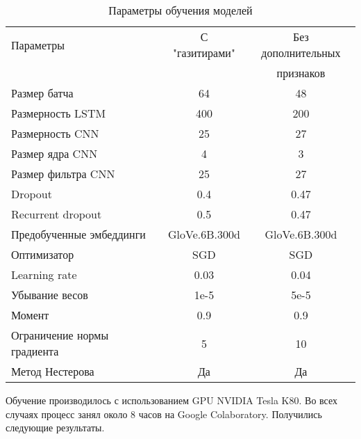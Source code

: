 \documentclass[a4paper,14pt]{extarticle}
\begin{document}
\begin{table}[H]
    \caption{Параметры обучения моделей}
    \label{progress}
    \begin{center}
    \begin{tabular}{l|c|c}
        Параметры                   & С "газитирами" & Без дополнительных \\
                                    &                & признаков          \\
        \hline
        Размер батча                & 64             & 48                 \\
        Размерность LSTM            & 400            & 200                \\
        Размерность CNN             & 25             & 27                 \\
        Размер ядра CNN             & 4              & 3                  \\
        Размер фильтра CNN          & 25             & 27                 \\
        Dropout                     & 0.4            & 0.47               \\
        Recurrent dropout           & 0.5            & 0.47               \\
        Предобученные эмбеддинги    & GloVe.6B.300d  & GloVe.6B.300d      \\
        Оптимизатор                 & SGD            & SGD                \\
        Learning rate               & 0.03           & 0.04               \\
        Убывание весов              & 1e-5           & 5e-5               \\
        Момент                      & 0.9            & 0.9                \\
        Ограничение нормы градиента & 5              & 10                 \\
        Метод Нестерова             & Да             & Да                 \\
    \end{tabular}
    \end{center}
\end{table}

Обучение производилось с использованием GPU NVIDIA Tesla K80. Во всех случаях процесс занял около 8 часов на Google Colaboratory. Получились следующие результаты.
\end{document}
